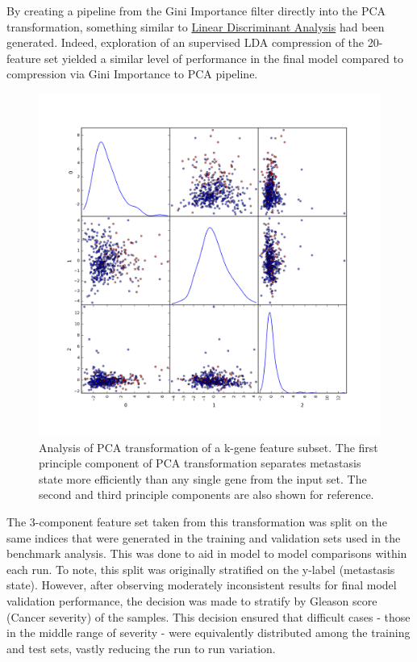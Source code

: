 \documentclass[final]{article}
\begin{document}
By creating a pipeline from the  Gini Importance filter directly into the PCA
transformation, something similar to
\href{http://scikit-learn.org/0.16/modules/generated/sklearn.lda.LDA.html}{Linear
Discriminant Analysis} had been generated.  Indeed, exploration of an supervised
LDA compression of the 20-feature set yielded a similar level of performance in
the final model compared to compression via Gini Importance to PCA pipeline.

\begin{figure}
  \centering
  \includegraphics[scale = 0.5]{pcaScatter}
  \caption{\label{fig:pcaScatter}Analysis of PCA transformation of a k-gene feature subset.  The first principle component of PCA transformation separates metastasis state more efficiently than any single gene from the input set.  The second and third principle components are also shown for reference.}
\end{figure}

The 3-component feature set taken from this transformation was split on the same indices that were generated in
the training and validation sets used in the benchmark analysis.  This was done
to aid in model to model comparisons within each run.  To note, this split was
originally stratified on the y-label (metastasis state).  However, after
observing moderately inconsistent results for final model validation
performance, the decision was made to stratify by Gleason score (Cancer
severity) of the samples.   This decision ensured that difficult cases - those
in the middle range of severity - were equivalently distributed among the
training and test sets, vastly reducing the run to run variation.
\end{document}
